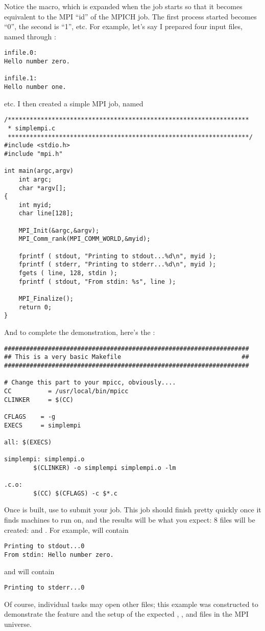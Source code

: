 Notice the  macro, which is expanded when the job starts so that
it becomes equivalent to the MPI ``id'' of the MPICH job.  The first 
process started becomes ``0'', the second is ``1'', etc.  For example, 
let's say I prepared four input files, named  through 
:
\begin{verbatim}
infile.0: 
Hello number zero.

infile.1: 
Hello number one.
\end{verbatim}
etc.  I then created a simple MPI job, named 
\begin{verbatim}
/******************************************************************
 * simplempi.c
 ******************************************************************/
#include <stdio.h>
#include "mpi.h"

int main(argc,argv)
    int argc;
    char *argv[];
{
    int myid;
    char line[128];

    MPI_Init(&argc,&argv);
    MPI_Comm_rank(MPI_COMM_WORLD,&myid);

    fprintf ( stdout, "Printing to stdout...%d\n", myid );
    fprintf ( stderr, "Printing to stderr...%d\n", myid );
    fgets ( line, 128, stdin );
    fprintf ( stdout, "From stdin: %s", line );

    MPI_Finalize();
    return 0;
}
\end{verbatim}
And to complete the demonstration, here's the :
\begin{verbatim}
###################################################################
## This is a very basic Makefile                                 ##
###################################################################

# Change this part to your mpicc, obviously....
CC          = /usr/local/bin/mpicc
CLINKER     = $(CC)

CFLAGS    = -g
EXECS     = simplempi

all: $(EXECS)

simplempi: simplempi.o
        $(CLINKER) -o simplempi simplempi.o -lm

.c.o:
        $(CC) $(CFLAGS) -c $*.c
\end{verbatim}

Once  is built, use  to submit your job.
This job should finish pretty quickly once it finds machines to run on,
and the results will be what you expect:  8 files will be created:  
 and .  For example, 
will contain
\begin{verbatim}
Printing to stdout...0
From stdin: Hello number zero.
\end{verbatim}
and  will contain
\begin{verbatim}
Printing to stderr...0
\end{verbatim}

Of course, individual tasks may open other files; this example was 
constructed to demonstrate the  feature and the setup of
the expected , , and  files in the MPI
universe.  
